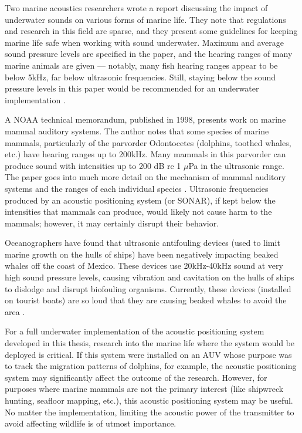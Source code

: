 \documentclass[11pt]{ucthesisCP}
\begin{document}
Two marine acoustics researchers wrote a report discussing the impact of underwater sounds on various forms of marine life. They note that regulations and research in this field are sparse, and they present some guidelines for keeping marine life safe when working with sound underwater. Maximum and average sound pressure levels are specified in the paper, and the hearing ranges of many marine animals are given --- notably, many fish hearing ranges appear to be below 5kHz, far below ultrasonic frequencies. Still, staying below the sound pressure levels in this paper would be recommended for an underwater implementation \cite{assessing}.

A NOAA technical memorandum, published in 1998, presents work on marine mammal auditory systems. The author notes that some species of marine mammals, particularly of the parvorder Odontocetes (dolphins, toothed whales, etc.) have hearing ranges up to 200kHz. Many mammals in this parvorder can produce sound with intensities up to 200 dB re 1 \(\mu\)Pa in the ultrasonic range. The paper goes into much more detail on the mechanism of mammal auditory systems and the ranges of each individual species \cite{implications}. Ultrasonic frequencies produced by an acoustic positioning system (or SONAR), if kept below the intensities that mammals can produce, would likely not cause harm to the mammals; however, it may certainly disrupt their behavior.

Oceanographers have found that ultrasonic antifouling devices (used to limit marine growth on the hulls of ships) have been negatively impacting beaked whales off the coast of Mexico. These devices use 20kHz-40kHz sound at very high sound pressure levels, causing vibration and cavitation on the hulls of ships to dislodge and disrupt biofouling organisms. Currently, these devices (installed on tourist boats) are so loud that they are causing beaked whales to avoid the area \cite{cuvier}.

For a full underwater implementation of the acoustic positioning system developed in this thesis, research into the marine life where the system would be deployed is critical. If this system were installed on an AUV whose purpose was to track the migration patterns of dolphins, for example, the acoustic positioning system may significantly affect the outcome of the research. However, for purposes where marine mammals are not the primary interest (like shipwreck hunting, seafloor mapping, etc.), this acoustic positioning system may be useful. No matter the implementation, limiting the acoustic power of the transmitter to avoid affecting wildlife is of utmost importance.
\end{document}
